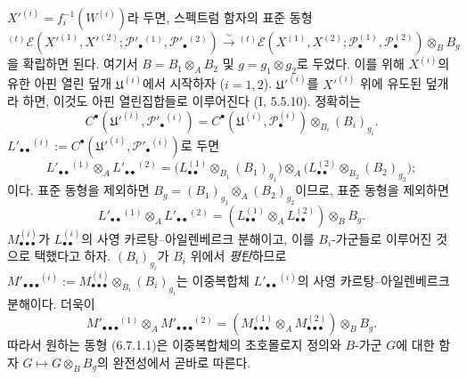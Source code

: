 \begin{env}[6.7.1]
$X'^{(i)}=f_i^{-1}(W^{(i)})$라 두면, 스펙트럼 함자의 표준 동형
\[
  {}^{(t)}\mathscr E
  (X'^{(1)},X'^{(2)};
   \mathscr P'_\bullet{}^{(1)},\mathscr P'_\bullet{}^{(2)})
  \xrightarrow{\sim}
  {}^{(t)}\mathscr E
  (X^{(1)},X^{(2)};
   \mathscr P_\bullet^{(1)},\mathscr P_\bullet^{(2)})
  \otimes_B B_g
  \tag{6.7.1.1}\label{III.6.7.1.1.fr}
\]
을 확립하면 된다. 여기서 $B=B_1\otimes_A B_2$ 및
$g=g_1\otimes g_2$로 두었다. 이를 위해 $X^{(i)}$의 유한 아핀
열린 덮개 $\mathfrak U^{(i)}$에서 시작하자 ($i=1,2$).
$\mathfrak U'^{(i)}$를 $X'^{(i)}$ 위에 유도된 덮개라 하면, 이것도
아핀 열린집합들로 이루어진다 (I, 5.5.10). 정확히는
\[
  C^\bullet(\mathfrak U'^{(i)},\mathscr P'_\bullet{}^{(i)})
  =C^\bullet(\mathfrak U^{(i)},\mathscr P_\bullet^{(i)})
   \otimes_{B_i}(B_i)_{g_i}.
\]
$L'_{\bullet\bullet}{}^{(i)}
:=C^\bullet(\mathfrak U'^{(i)},\mathscr P'_\bullet{}^{(i)})$로 두면
\[
  L'_{\bullet\bullet}{}^{(1)}\otimes_A L'_{\bullet\bullet}{}^{(2)}
  =\bigl(L_{\bullet\bullet}^{(1)}\otimes_{B_1}(B_1)_{g_1}\bigr)
   \otimes_A
   \bigl(L_{\bullet\bullet}^{(2)}\otimes_{B_2}(B_2)_{g_2}\bigr);
\]
이다. 표준 동형을 제외하면
$B_g=(B_1)_{g_1}\otimes_A(B_2)_{g_2}$이므로, 표준 동형을 제외하면
\[
  L'_{\bullet\bullet}{}^{(1)}\otimes_A L'_{\bullet\bullet}{}^{(2)}
  =(L_{\bullet\bullet}^{(1)}\otimes_A L_{\bullet\bullet}^{(2)})
    \otimes_B B_g.
\]
$M_{\bullet\bullet\bullet}^{(i)}$가
$L_{\bullet\bullet}^{(i)}$의 사영 카르탕--아일렌베르크 분해이고,
이를 $B_i$-가군들로 이루어진 것으로 택했다고 하자.
$(B_i)_{g_i}$가 $B_i$ 위에서 \emph{평탄}하므로
$M'_{\bullet\bullet\bullet}{}^{(i)}
:=M_{\bullet\bullet\bullet}^{(i)}\otimes_{B_i}(B_i)_{g_i}$는 이중복합체
$L'_{\bullet\bullet}{}^{(i)}$의 사영 카르탕--아일렌베르크 분해이다.
더욱이
\[
  M'_{\bullet\bullet\bullet}{}^{(1)}\otimes_A M'_{\bullet\bullet\bullet}{}^{(2)}
  =(M_{\bullet\bullet\bullet}^{(1)}\otimes_A M_{\bullet\bullet\bullet}^{(2)})
    \otimes_B B_g.
\]
따라서 원하는 동형 (6.7.1.1)은 이중복합체의 초호몰로지 정의와
$B$-가군 $G$에 대한 함자 $G\mapsto G\otimes_B B_g$의 완전성에서
곧바로 따른다.
\end{env}

